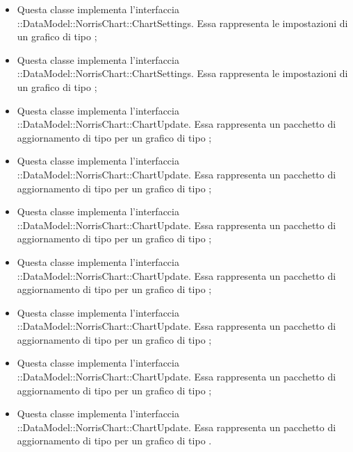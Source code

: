 \begin{itemize}
		\item {} Questa classe implementa l'interfaccia ::DataModel::NorrisChart::ChartSettings. Essa rappresenta le impostazioni di un grafico di tipo ;

		\item {} Questa classe implementa l'interfaccia ::DataModel::NorrisChart::ChartSettings. Essa rappresenta le impostazioni di un grafico di tipo ;

		\item {} Questa classe implementa l'interfaccia ::DataModel::NorrisChart::ChartUpdate. Essa rappresenta un pacchetto di aggiornamento di tipo  per un grafico di tipo ;

		\item {} Questa classe implementa l'interfaccia ::DataModel::NorrisChart::ChartUpdate. Essa rappresenta un pacchetto di aggiornamento di tipo  per un grafico di tipo ;

		\item {} Questa classe implementa l'interfaccia ::DataModel::NorrisChart::ChartUpdate. Essa rappresenta un pacchetto di aggiornamento di tipo  per un grafico di tipo ;

		\item {} Questa classe implementa l'interfaccia ::DataModel::NorrisChart::ChartUpdate. Essa rappresenta un pacchetto di aggiornamento di tipo  per un grafico di tipo ;

		\item {} Questa classe implementa l'interfaccia ::DataModel::NorrisChart::ChartUpdate. Essa rappresenta un pacchetto di aggiornamento di tipo  per un grafico di tipo ;

		\item {} Questa classe implementa l'interfaccia ::DataModel::NorrisChart::ChartUpdate. Essa rappresenta un pacchetto di aggiornamento di tipo  per un grafico di tipo ;

		\item {} Questa classe implementa l'interfaccia ::DataModel::NorrisChart::ChartUpdate. Essa rappresenta un pacchetto di aggiornamento di tipo  per un grafico di tipo .
	\end{itemize}
